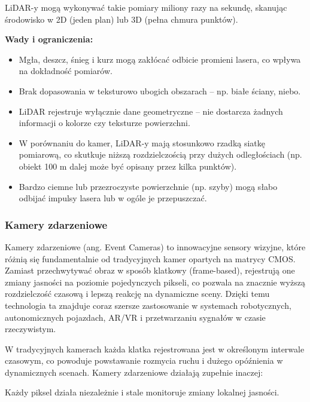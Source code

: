 \documentclass[magisterska]{pracadypl}
\begin{document}
LiDAR-y mogą wykonywać takie pomiary miliony razy na sekundę, skanując środowisko w 2D (jeden plan) lub 3D (pełna chmura punktów).

\begin{minipage}[t]{\textwidth}
\textbf{Wady i ograniczenia:}
\begin{itemize}
  \item Mgła, deszcz, śnieg i kurz mogą zakłócać odbicie promieni lasera, co wpływa na dokładność pomiarów.

  \item Brak dopasowania w teksturowo ubogich obszarach – np. białe ściany, niebo.

  \item LiDAR rejestruje wyłącznie dane geometryczne – nie dostarcza żadnych informacji o kolorze czy teksturze powierzchni.

  \item W porównaniu do kamer, LiDAR-y mają stosunkowo rzadką siatkę pomiarową, co skutkuje niższą rozdzielczością przy dużych odległościach (np. obiekt 100 m dalej może być opisany przez kilka punktów).

  \item Bardzo ciemne lub przezroczyste powierzchnie (np. szyby) mogą słabo odbijać impulsy lasera lub w ogóle je przepuszczać.
\end{itemize}
\end{minipage}

\subsubsection*{Kamery zdarzeniowe}

Kamery zdarzeniowe (ang. Event Cameras) to innowacyjne sensory wizyjne, które różnią się fundamentalnie od tradycyjnych kamer opartych na matrycy CMOS. Zamiast przechwytywać obraz w sposób klatkowy (frame-based), rejestrują one zmiany jasności na poziomie pojedynczych pikseli, co pozwala na znacznie wyższą rozdzielczość czasową i lepszą reakcję na dynamiczne sceny. Dzięki temu technologia ta znajduje coraz szersze zastosowanie w systemach robotycznych, autonomicznych pojazdach, AR/VR i przetwarzaniu sygnałów w czasie rzeczywistym.

W tradycyjnych kamerach każda klatka rejestrowana jest w określonym interwale czasowym, co powoduje powstawanie rozmycia ruchu i dużego opóźnienia w dynamicznych scenach. Kamery zdarzeniowe działają zupełnie inaczej:

Każdy piksel działa niezależnie i stale monitoruje zmiany lokalnej jasności.
\end{document}
